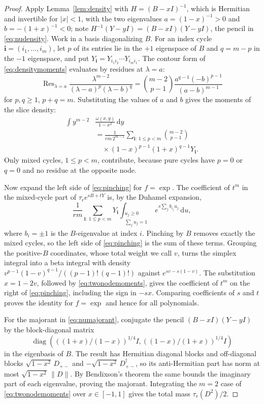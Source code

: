 \documentclass[aps,prl,reprint,superscriptaddress,longbibliography,floatfix,raggedbottom]{revtex4-2}
\newcommand{\dd}{\,\mathrm d}
\newcommand{\norm}[1]{\lVert #1\rVert}
\newcommand{\abs}[1]{\lvert #1\rvert}
\DeclareMathOperator{\diag}{diag}
\DeclareMathOperator*{\Res}{Res}
\newcommand{\tr}{\tau}
\begin{document}
\begin{proof}
Apply Lemma~\ref{lem:density} with $H=(B-xI)^{-1}$, which is Hermitian
and invertible for $\abs x<1$, with the two eigenvalues
$a=(1-x)^{-1}>0$ and $b=-(1+x)^{-1}<0$; note
$H^{-1}(Y-yI)=(B-xI)(Y-yI)$, the pencil in \eqref{eq:nudensity}. Work
in a basis diagonalizing $B$. For an index cycle
$\mathbf i=(i_1,\dots,i_m)$, let $p$ of its entries lie in the $+1$
eigenspace of $B$ and $q=m-p$ in the $-1$ eigenspace, and put
$Y_{\mathbf i}=Y_{i_1i_2}\cdots Y_{i_mi_1}$. The contour form of
\eqref{eq:densitymoments} evaluates by residues at $\lambda=a$:
\begin{equation}\label{eq:twonoderesidue}
\Res_{\lambda=a}
\frac{\lambda^{m-2}}{(\lambda-a)^p(\lambda-b)^q}
=\binom{m-2}{p-1}
\frac{a^{q-1}(-b)^{p-1}}{(a-b)^{m-1}}
\end{equation}
for $p,q\ge1$, $p+q=m$. Substituting the values of $a$ and $b$ gives
the moments of the slice density:
\begin{equation}\label{eq:twonodemoments}
\begin{split}
\int y^{m-2}&\frac{\omega(x,y)}{1-x^2}\dd y\\
&=\frac1{rm\,2^{m-1}}
\sum_{\mathbf i:\,1\le p<m}
\binom{m-2}{p-1}\\
&\quad\times(1-x)^{p-1}(1+x)^{q-1}Y_{\mathbf i}.
\end{split}
\end{equation}
Only mixed cycles, $1\le p<m$, contribute, because pure cycles have
$p=0$ or $q=0$ and no residue at the opposite node.

Now expand the left side of \eqref{eq:pinching} for $f=\exp$. The
coefficient of $t^m$ in the mixed-cycle part of $\tr_re^{sB+tY}$ is, by
the Duhamel expansion,
\[
\frac1{rm}\sum_{\mathbf i:\,1\le p<m}Y_{\mathbf i}
\int_{\substack{u_j\ge0\\\sum_ju_j=1}}
e^{s\sum_jb_{i_j}u_j}\dd u,
\]
where $b_{i}=\pm1$ is the $B$-eigenvalue at index $i$. Pinching by $B$
removes exactly the mixed cycles, so the left side of
\eqref{eq:pinching} is the sum of these terms. Grouping the
positive-$B$ coordinates, whose total weight we call $v$, turns the
simplex integral into a beta integral with density
$v^{p-1}(1-v)^{q-1}/((p-1)!\,(q-1)!)$ against $e^{sv-s(1-v)}$. The
substitution $x=1-2v$, followed by \eqref{eq:twonodemoments}, gives the
coefficient of $t^m$ on the right of \eqref{eq:pinching}, including the
sign in $-sx$. Comparing coefficients of $s$ and $t$ proves the
identity for $f=\exp$ and hence for all polynomials.

For the majorant in \eqref{eq:numajorant}, conjugate the pencil
$(B-xI)(Y-yI)$ by the block-diagonal matrix
\[
\diag(((1+x)/(1-x))^{1/4}I,((1-x)/(1+x))^{1/4}I)
\]
in the eigenbasis of
$B$. The result has Hermitian diagonal blocks and off-diagonal blocks
$\sqrt{1-x^2}\,D_{+-}$ and $-\sqrt{1-x^2}\,D_{+-}^\dagger$, so its
anti-Hermitian part has norm at most $\sqrt{1-x^2}\,\norm D$. By
Bendixson's theorem the same bounds the imaginary part of each
eigenvalue, proving the majorant. Integrating the $m=2$ case of
\eqref{eq:twonodemoments} over $x\in[-1,1]$ gives the total mass
$\tr_r(D^2)/2$.
\end{proof}
\end{document}
